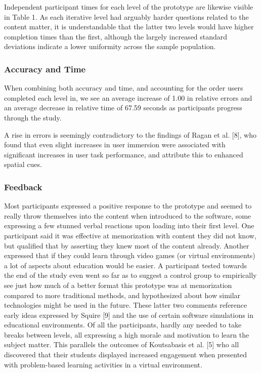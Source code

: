 \documentclass{vgtc}                          %
\begin{document}
Independent participant times for each level of the prototype are likewise visible in Table 1. As each iterative level had arguably harder questions related to the content matter, it is understandable that the latter two levels would have higher completion times than the first, although the largely increased standard deviations indicate a lower uniformity across the sample population.

\subsubsection{Accuracy and Time}

When combining both accuracy and time, and accounting for the order users completed each level in, we see an average increase of 1.00 in relative errors and an average decrease in relative time of 67.59 seconds as participants progress through the study.

A rise in errors is seemingly contradictory to the findings of Ragan et al. [8], who found that even slight increases in user immersion were associated with significant increases in user task performance, and attribute this to enhanced spatial cues. 

\subsubsection{Feedback}

Most participants expressed a positive response to the prototype and seemed to really throw themselves into the content when introduced to the software, some expressing a few stunned verbal reactions upon loading into their first level. One participant said it was effective at memorization with content they did not know, but qualified that by asserting they knew most of the content already. Another expressed that if they could learn through video games (or virtual environments) a lot of aspects about education would be easier. A participant tested towards the end of the study even went so far as to suggest a control group to empirically see just how much of a better format this prototype was at memorization compared to more traditional methods, and hypothesized about how similar technologies might be used in the future. These latter two comments reference early ideas expressed by Squire [9] and the use of certain software simulations in educational environments. Of all the participants, hardly any needed to take breaks between levels, all expressing a high morale and motivation to learn the subject matter. This parallels the outcomes of Koutsabasis et al. [5] who all discovered that their students displayed increased engagement when presented with problem-based learning activities in a virtual environment.
\end{document}
